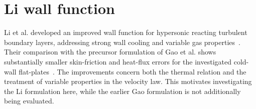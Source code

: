 \section{Li wall function}
\label{sec:wall-functions:gao-li}

Li et al. developed an improved wall function for hypersonic reacting turbulent boundary layers, addressing strong wall cooling and variable gas properties~\cite{li2025WF}. Their comparison with the precursor formulation of Gao et al. shows substantially smaller skin-friction and heat-flux errors for the investigated cold-wall flat-plates~\cite[Section~IV.B, Figures~17--20]{li2025WF}. The improvements concern both the thermal relation and the treatment of variable properties in the velocity law. This motivates investigating the Li formulation here, while the earlier Gao formulation is not additionally being evaluated.





